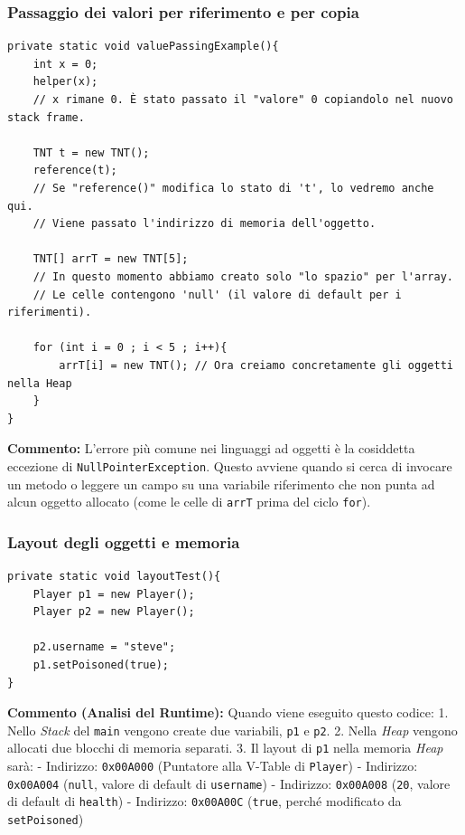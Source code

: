 \documentclass[12pt, a4paper]{article}
\begin{document}
\subsubsection{Passaggio dei valori per riferimento e per copia}
\begin{verbatim}
private static void valuePassingExample(){
    int x = 0;
    helper(x); 
    // x rimane 0. È stato passato il "valore" 0 copiandolo nel nuovo stack frame.

    TNT t = new TNT();
    reference(t); 
    // Se "reference()" modifica lo stato di 't', lo vedremo anche qui.
    // Viene passato l'indirizzo di memoria dell'oggetto.

    TNT[] arrT = new TNT[5];
    // In questo momento abbiamo creato solo "lo spazio" per l'array.
    // Le celle contengono 'null' (il valore di default per i riferimenti).

    for (int i = 0 ; i < 5 ; i++){
        arrT[i] = new TNT(); // Ora creiamo concretamente gli oggetti nella Heap
    }
}
\end{verbatim}
\textbf{Commento:} L'errore più comune nei linguaggi ad oggetti è la cosiddetta eccezione di \texttt{NullPointerException}. Questo avviene quando si cerca di invocare un metodo o leggere un campo su una variabile riferimento che non punta ad alcun oggetto allocato (come le celle di \texttt{arrT} prima del ciclo \texttt{for}).

\newpage

\subsubsection{Layout degli oggetti e memoria}

\begin{verbatim}
private static void layoutTest(){
    Player p1 = new Player();
    Player p2 = new Player();
    
    p2.username = "steve";
    p1.setPoisoned(true);
}
\end{verbatim}
\textbf{Commento (Analisi del Runtime):} Quando viene eseguito questo codice:
1. Nello \textit{Stack} del \texttt{main} vengono create due variabili, \texttt{p1} e \texttt{p2}.
2. Nella \textit{Heap} vengono allocati due blocchi di memoria separati.
3. Il layout di \texttt{p1} nella memoria \textit{Heap} sarà:
   - Indirizzo: \texttt{0x00A000} (Puntatore alla V-Table di \texttt{Player})
   - Indirizzo: \texttt{0x00A004} (\texttt{null}, valore di default di \texttt{username})
   - Indirizzo: \texttt{0x00A008} (\texttt{20}, valore di default di \texttt{health})
   - Indirizzo: \texttt{0x00A00C} (\texttt{true}, perché modificato da \texttt{setPoisoned})
\end{document}
